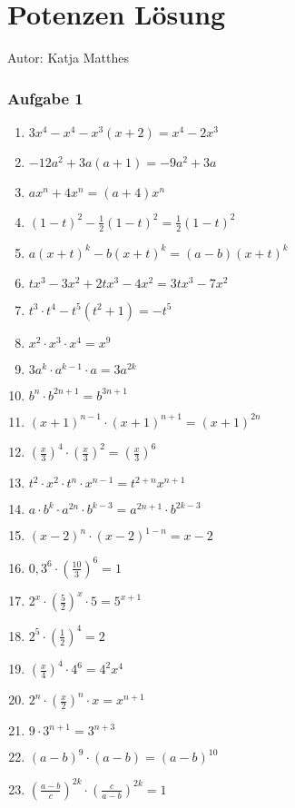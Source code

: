 \section{Potenzen Lösung}
Autor: Katja Matthes

\subsubsection{Aufgabe 1}
\begin{enumerate}
	\item \quad $ 3x^4 - x^4 - x^3(x + 2) = x^4 - 2x^3 $								%
	\item \quad $ -12a^2 + 3a(a + 1) = -9a^2 + 3a $								%
	\item \quad $ ax^n + 4x^n = (a + 4)x^n $								%
	\item \quad $ (1-t)^2 - \frac{1}{2}(1-t)^2 = \frac{1}{2}(1 - t)^2 $			%
	\item \quad $ a(x+t)^k - b(x+t)^k = (a-b)(x+t)^k $							%
	\item \quad $ tx^3 - 3x^2 + 2tx^3 - 4x^2 = 3tx^3 - 7x^2 $							%
	\item \quad $ t^3 \cdot t^4 - t^5(t^2+1) = -t^5 $											%
	\item \quad $ x^2 \cdot x^3 \cdot x^4 = x^9 $												%
	\item \quad $ 3a^k \cdot a^{k-1} \cdot a = 3a^{2k} $										%
	\item \quad $ b^n \cdot b^{2n+1} = b^{3n+1} $									%
	\item \quad $ (x+1)^{n-1} \cdot (x+1)^{n+1} = (x+1)^{2n} $								%
	\item \quad $ \left(\frac{x}{3}\right)^4 \cdot \left(\frac{x}{3}\right)^2 = \left(\frac{x}{3}\right)^6 $%
	\item \quad $ t^2 \cdot x^2 \cdot t^n \cdot x^{n-1} = t^{2+n} x^{n+1} $						%
	\item \quad $ a \cdot b^k \cdot a^{2n} \cdot b^{k-3} = a^{2n+1} \cdot b^{2k-3} $		%
	\item \quad $ (x-2)^n \cdot (x-2)^{1-n} = x-2 $												%
	\item \quad $ 0,3^6 \cdot \left(\frac{10}{3}\right)^6 = 1 $													%
	\item \quad $ 2^x \cdot \left(\frac{5}{2}\right)^x \cdot 5 = 5^{x+1} $										%
	\item \quad $ 2^5 \cdot \left(\frac{1}{2}\right)^4 = 2 $													%
	\item \quad $ \left(\frac{x}{4}\right)^4 \cdot 4^6 = 4^2x^4 $										%
	\item \quad $ 2^n \cdot \left(\frac{x}{2}\right)^n \cdot x = x^{n+1} $										%
	\item \quad $ 9 \cdot 3^{n+1} = 3^{n+3} $										%
	\item \quad $ (a-b)^9 \cdot (a-b) = (a-b)^{10} $								%
	\item \quad $ \left(\frac{a-b}{c}\right)^{2k} \cdot \left(\frac{c}{a-b}\right)^{2k} = 1 $													%
\end{enumerate}

